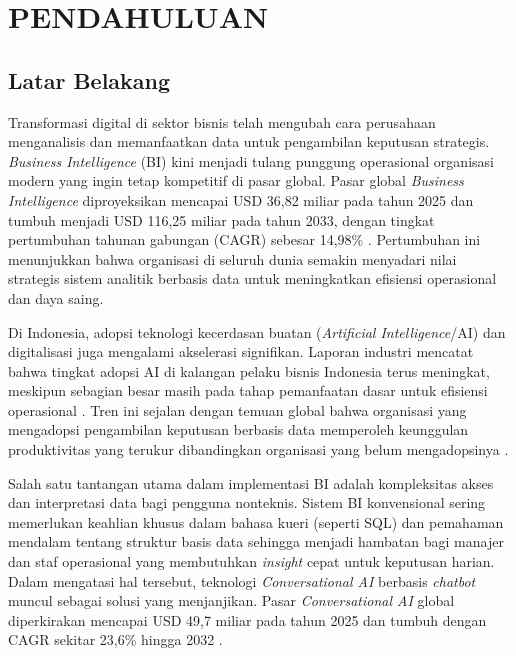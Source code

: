 \chapter{PENDAHULUAN}
\label{chap:pendahuluan}
\section{Latar Belakang}

Transformasi digital di sektor bisnis telah mengubah cara perusahaan menganalisis dan memanfaatkan data untuk pengambilan keputusan strategis. \textit{Business Intelligence} (BI)\label{abbr:BI} kini menjadi tulang punggung operasional organisasi modern yang ingin tetap kompetitif di pasar global. Pasar global \textit{Business Intelligence} diproyeksikan mencapai USD 36{,}82 miliar pada tahun 2025 dan tumbuh menjadi USD 116{,}25 miliar pada tahun 2033, dengan tingkat pertumbuhan tahunan gabungan (CAGR)\label{abbr:CAGR} sebesar 14{,}98\% \autocite{Straits2024}. Pertumbuhan ini menunjukkan bahwa organisasi di seluruh dunia semakin menyadari nilai strategis sistem analitik berbasis data untuk meningkatkan efisiensi operasional dan daya saing.

Di Indonesia, adopsi teknologi kecerdasan buatan (\textit{Artificial Intelligence}/AI)\label{abbr:AI} dan digitalisasi juga mengalami akselerasi signifikan. Laporan industri mencatat bahwa tingkat adopsi AI di kalangan pelaku bisnis Indonesia terus meningkat, meskipun sebagian besar masih pada tahap pemanfaatan dasar untuk efisiensi operasional \autocite{EastVC2025}. Tren ini sejalan dengan temuan global bahwa organisasi yang mengadopsi pengambilan keputusan berbasis data memperoleh keunggulan produktivitas yang terukur dibandingkan organisasi yang belum mengadopsinya \autocite{gul2023from}.

Salah satu tantangan utama dalam implementasi BI adalah kompleksitas akses dan interpretasi data bagi pengguna nonteknis. Sistem BI konvensional sering memerlukan keahlian khusus dalam bahasa kueri (seperti SQL\label{abbr:SQL}) dan pemahaman mendalam tentang struktur basis data sehingga menjadi hambatan bagi manajer dan staf operasional yang membutuhkan \textit{insight} cepat untuk keputusan harian. Dalam mengatasi hal tersebut, teknologi \textit{Conversational AI} berbasis \textit{chatbot} muncul sebagai solusi yang menjanjikan. Pasar \textit{Conversational AI} global diperkirakan mencapai USD 49{,}7 miliar pada tahun 2025 dan tumbuh dengan CAGR sekitar 23{,}6\% hingga 2032 \autocite{Qaltivate2025}.

